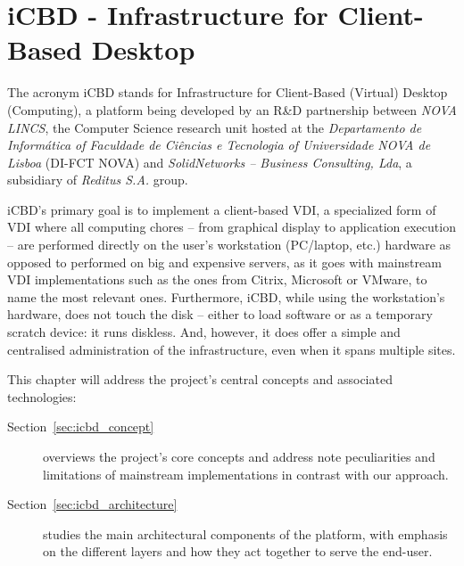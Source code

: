 

\chapter{iCBD - Infrastructure for Client-Based Desktop}
\label{cha:icbd}

The acronym \gls{iCBD} stands for Infrastructure for Client-Based (Virtual) Desktop (Computing), a platform being developed by an R\&D partnership between\textit{ NOVA LINCS}, the Computer Science research unit hosted at the \textit{Departamento de Informática of Faculdade de Ciências e Tecnologia of Universidade NOVA de Lisboa} (DI-FCT NOVA) and \textit{SolidNetworks – Business Consulting, Lda}, a subsidiary of \textit{Reditus S.A.} group. 

iCBD’s primary goal is to implement a client-based VDI, a specialized form of \gls{VDI} where all computing chores – from graphical display to application execution – are performed directly on the user’s workstation (PC/laptop, etc.) hardware as opposed to performed on big and expensive servers, as it goes with mainstream VDI implementations such as the ones from Citrix, Microsoft or VMware, to name the most relevant ones. Furthermore, iCBD, while using the workstation’s hardware, does not touch the disk – either to load software or as a temporary scratch device: it runs diskless. And, however, it does offer a simple and centralised administration of the infrastructure, even when it spans multiple sites.

This chapter will address the project’s central concepts and associated technologies:

\begin{description}
	\item [Section~\ref{sec:icbd_concept}] overviews the project’s core concepts and address note peculiarities and limitations of mainstream implementations in contrast with our approach.
	\item [Section~\ref{sec:icbd_architecture}] studies the main architectural components of the platform, with emphasis on the different layers and how they act together to serve the end-user.
\end{description}
\newpage


